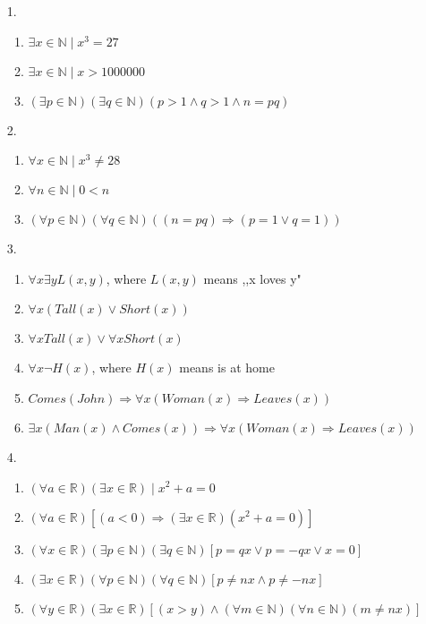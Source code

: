 \documentclass[11pt]{exam}
\author{@dante}
\begin{document}

\begin{enumerate}[leftmargin=0pt]

\item[1.]
\begin{enumerate}[label=(\alph*)]
    \item $\exists x \in \mathbb{N} \mid x^3 = 27$
    \item $\exists x \in \mathbb{N} \mid x > 1000000$
    \item $(\exists p \in \mathbb{N})(\exists q \in \mathbb{N})(p > 1 \land q > 1 \land n = pq)$
\end{enumerate}

\item[2.]
\begin{enumerate}[label=(\alph*)]
    \item $\forall x \in \mathbb{N} \mid x^3 \neq 28$
    \item $\forall n \in \mathbb{N} \mid 0 < n$
    \item $(\forall p \in \mathbb{N})(\forall q \in \mathbb{N})((n = pq) \Rightarrow (p = 1 \lor q = 1))$ 
\end{enumerate}

\item[3.]
\begin{enumerate}[label=(\alph*)]
    \item $\forall x \exists y L(x,y)$, where $L(x,y)$ means ,,x loves y"
    \item $\forall x (Tall(x) \lor Short(x))$
    \item $\forall x Tall(x) \lor \forall x Short(x)$
    \item $\forall x \neg H(x)$, where $H(x)$ means is at home
    \item $Comes(John) \Rightarrow \forall x (Woman(x) \Rightarrow Leaves(x))$
    \item $\exists x (Man(x) \land Comes(x)) \Rightarrow \forall x (Woman(x) \Rightarrow Leaves(x))$
\end{enumerate}

\item[4.]
\begin{enumerate}[label=(\alph*)]
    \item $(\forall a \in \mathbb{R}) (\exists x \in \mathbb{R}) \mid x^2 + a = 0$
    \item $(\forall a \in \mathbb{R}) [(a < 0) \Rightarrow (\exists x \in \mathbb{R}) (x^2 + a = 0)]$
    \item $(\forall x \in \mathbb{R})(\exists p \in \mathbb{N})(\exists q \in \mathbb{N})[p = qx \lor p = -qx \lor x = 0]$
    \item $(\exists x \in \mathbb{R})(\forall p \in \mathbb{N})(\forall q \in \mathbb{N})[p \neq nx \land p \neq -nx ]$
    \item $(\forall y \in \mathbb{R})(\exists x \in \mathbb{R})[(x > y) \land (\forall m \in \mathbb{N})(\forall n \in \mathbb{N})(m \neq nx)]$
\end{enumerate}


\end{enumerate}
\end{document}
